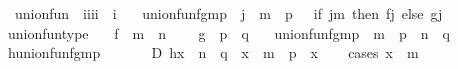 \begin{isabellebody}
%
\isamarkuptrue%
%
\endisatagdocument
{\isafolddocument}%
%
\isadelimdocument
%
\endisadelimdocument
{}\isamarkupfalse%
\isanewline
\ \ union{\isacharunderscore}{\kern0pt}fun\ {\isacharcolon}{\kern0pt}{\isacharcolon}{\kern0pt}\ {\isachardoublequoteopen}{\isacharbrackleft}{\kern0pt}i{\isacharcomma}{\kern0pt}i{\isacharcomma}{\kern0pt}i{\isacharcomma}{\kern0pt}i{\isacharbrackright}{\kern0pt}\ {\isasymRightarrow}\ i{\isachardoublequoteclose}\ \isanewline
\ \ {\isachardoublequoteopen}union{\isacharunderscore}{\kern0pt}fun{\isacharparenleft}{\kern0pt}f{\isacharcomma}{\kern0pt}g{\isacharcomma}{\kern0pt}m{\isacharcomma}{\kern0pt}p{\isacharparenright}{\kern0pt}\ {\isasymequiv}\ {\isasymlambda}j\ {\isasymin}\ m\ {\isasymunion}\ p\ \ {\isachardot}{\kern0pt}\ if\ j{\isasymin}m\ then\ f{\isacharbackquote}{\kern0pt}j\ else\ g{\isacharbackquote}{\kern0pt}j{\isachardoublequoteclose}\isanewline
\isanewline
{}\isamarkupfalse%
\ union{\isacharunderscore}{\kern0pt}fun{\isacharunderscore}{\kern0pt}type{\isacharcolon}{\kern0pt}\isanewline
\ \ \ {\isachardoublequoteopen}f\ {\isasymin}\ m\ {\isasymrightarrow}\ n{\isachardoublequoteclose}\isanewline
\ \ \ \ {\isachardoublequoteopen}g\ {\isasymin}\ p\ {\isasymrightarrow}\ q{\isachardoublequoteclose}\isanewline
\ \ \ {\isachardoublequoteopen}union{\isacharunderscore}{\kern0pt}fun{\isacharparenleft}{\kern0pt}f{\isacharcomma}{\kern0pt}g{\isacharcomma}{\kern0pt}m{\isacharcomma}{\kern0pt}p{\isacharparenright}{\kern0pt}\ {\isasymin}\ m\ {\isasymunion}\ p\ {\isasymrightarrow}\ n\ {\isasymunion}\ q{\isachardoublequoteclose}\isanewline
%
\isadelimproof
%
\endisadelimproof
%
\isatagproof
{}\isamarkupfalse%
\ {\isacharminus}{\kern0pt}\isanewline
\ \ \isamarkupfalse%
\ {\isacharquery}{\kern0pt}h{\isacharequal}{\kern0pt}{\isachardoublequoteopen}union{\isacharunderscore}{\kern0pt}fun{\isacharparenleft}{\kern0pt}f{\isacharcomma}{\kern0pt}g{\isacharcomma}{\kern0pt}m{\isacharcomma}{\kern0pt}p{\isacharparenright}{\kern0pt}{\isachardoublequoteclose}\isanewline
\ \ \isamarkupfalse%
\isanewline
\ \ \ \ D{\isacharcolon}{\kern0pt}\ {\isachardoublequoteopen}{\isacharquery}{\kern0pt}h{\isacharbackquote}{\kern0pt}x\ {\isasymin}\ n\ {\isasymunion}\ q{\isachardoublequoteclose}\ \ {\isachardoublequoteopen}x\ {\isasymin}\ m\ {\isasymunion}\ p{\isachardoublequoteclose}\ \ x\isanewline
\ \ \isamarkupfalse%
\ {\isacharparenleft}{\kern0pt}cases\ {\isachardoublequoteopen}x\ {\isasymin}\ m{\isachardoublequoteclose}{\isacharparenright}{\kern0pt}\isanewline

\end{isabellebody}
